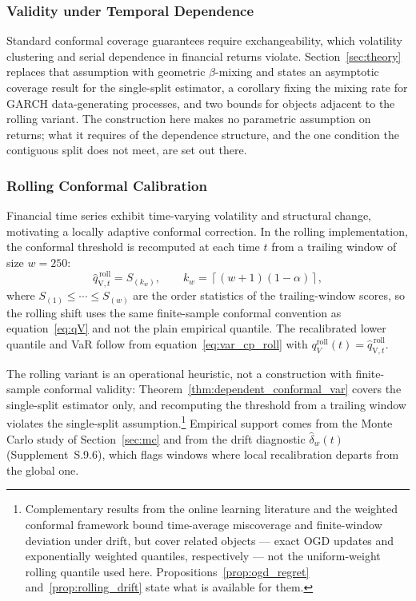 \documentclass[preprint,11pt,authoryear]{elsarticle}
\newcommand{\1}{\boldsymbol{1}}
\newcommand{\qVroll}{\hat{q}_{{\scriptscriptstyle\mathrm{V}},t}^{\,\mathrm{roll}}}
\begin{document}
\subsubsection{Validity under Temporal Dependence}
\label{sec:validity}

Standard conformal coverage guarantees require exchangeability, which volatility
clustering and serial dependence in financial returns violate.
Section~\ref{sec:theory} replaces that assumption with geometric $\beta$-mixing
and states an asymptotic coverage result for the single-split estimator, a
corollary fixing the mixing rate for GARCH data-generating processes, and two
bounds for objects adjacent to the rolling variant. The construction here makes
no parametric assumption on returns; what it requires of the dependence
structure, and the one condition the contiguous split does not meet, are set out
there.

\subsubsection{Rolling Conformal Calibration}
\label{sec:rolling_method}

Financial time series exhibit time-varying volatility and structural change, motivating a locally adaptive conformal correction. In the rolling implementation, the conformal threshold is recomputed at each time $t$ from a trailing window of size $w = 250$:
\begin{equation}
	\label{eq:qV_roll}
	\qVroll
	=
	S_{(k_w)},
	\qquad
	k_w = \left\lceil (w+1)(1-\alpha) \right\rceil,
\end{equation}
where $S_{(1)}\le\cdots\le S_{(w)}$ are the order statistics of the trailing-window scores, so the rolling shift uses the same finite-sample conformal convention as equation~\eqref{eq:qV} and not the plain empirical quantile. The recalibrated lower quantile and VaR follow from equation~\eqref{eq:var_cp_roll} with $q_V^{\mathrm{roll}}(t) = \qVroll$.

The rolling variant is an operational heuristic, not a construction with finite-sample conformal validity: Theorem~\ref{thm:dependent_conformal_var} covers the single-split estimator only, and recomputing the threshold from a trailing window violates the single-split assumption.\footnote{Complementary results from the online learning literature \citep{zinkevich2003online} and the weighted conformal framework \citep{barber2023conformal,angelopoulos2024pid} bound time-average miscoverage and finite-window deviation under drift, but cover related objects --- exact OGD updates and exponentially weighted quantiles, respectively --- not the uniform-weight rolling quantile used here. Propositions~\ref{prop:ogd_regret} and~\ref{prop:rolling_drift} state what is available for them.} Empirical support comes from the Monte Carlo study of Section~\ref{sec:mc} and from the drift diagnostic $\hat\delta_w(t)$ (Supplement~S.9.6), which flags windows where local recalibration departs from the global one.
\end{document}
